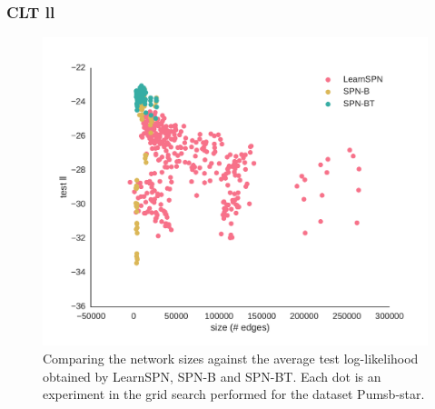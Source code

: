 \documentclass[xcolor={usenames,dvipsnames,svgnames}, compress]{beamer}
\begin{document}
\begin{frame}
  \frametitle{CLT ll}

  \begin{figure}[htbp]
    \begin{center}
      \includegraphics[width=0.7\linewidth]{figures/ll-depth/10-8/pumsb-star-ll-depth}
      \caption{Comparing the network sizes against
        the average test log-likelihood obtained by \textsf{LearnSPN},
        \textsf{SPN-B} and \textsf{SPN-BT}. Each dot is an experiment
        in the grid search performed for the dataset Pumsb-star.}
    \end{center}
  \end{figure}

\end{frame}
\end{document}
